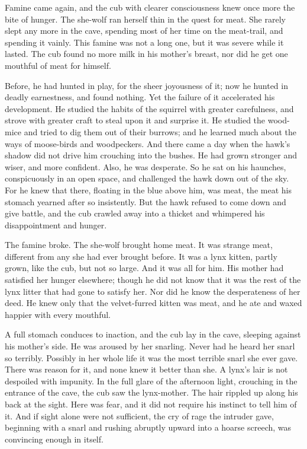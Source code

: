 \documentclass[10pt]{book}
\begin{document}
Famine came again, and the cub with clearer consciousness knew once
more the bite of hunger. The she-wolf ran herself thin in the quest for
meat. She rarely slept any more in the cave, spending most of her time
on the meat-trail, and spending it vainly. This famine was not a long
one, but it was severe while it lasted. The cub found no more milk in
his mother’s breast, nor did he get one mouthful of meat for himself.

Before, he had hunted in play, for the sheer joyousness of it; now he
hunted in deadly earnestness, and found nothing. Yet the failure of it
accelerated his development. He studied the habits of the squirrel with
greater carefulness, and strove with greater craft to steal upon it and
surprise it. He studied the wood-mice and tried to dig them out of
their burrows; and he learned much about the ways of moose-birds and
woodpeckers. And there came a day when the hawk’s shadow did not drive
him crouching into the bushes. He had grown stronger and wiser, and
more confident. Also, he was desperate. So he sat on his haunches,
conspicuously in an open space, and challenged the hawk down out of the
sky. For he knew that there, floating in the blue above him, was meat,
the meat his stomach yearned after so insistently. But the hawk refused
to come down and give battle, and the cub crawled away into a thicket
and whimpered his disappointment and hunger.

The famine broke. The she-wolf brought home meat. It was strange meat,
different from any she had ever brought before. It was a lynx kitten,
partly grown, like the cub, but not so large. And it was all for him.
His mother had satisfied her hunger elsewhere; though he did not know
that it was the rest of the lynx litter that had gone to satisfy her.
Nor did he know the desperateness of her deed. He knew only that the
velvet-furred kitten was meat, and he ate and waxed happier with every
mouthful.

A full stomach conduces to inaction, and the cub lay in the cave,
sleeping against his mother’s side. He was aroused by her snarling.
Never had he heard her snarl so terribly. Possibly in her whole life it
was the most terrible snarl she ever gave. There was reason for it, and
none knew it better than she. A lynx’s lair is not despoiled with
impunity. In the full glare of the afternoon light, crouching in the
entrance of the cave, the cub saw the lynx-mother. The hair rippled up
along his back at the sight. Here was fear, and it did not require his
instinct to tell him of it. And if sight alone were not sufficient, the
cry of rage the intruder gave, beginning with a snarl and rushing
abruptly upward into a hoarse screech, was convincing enough in itself.
\end{document}
